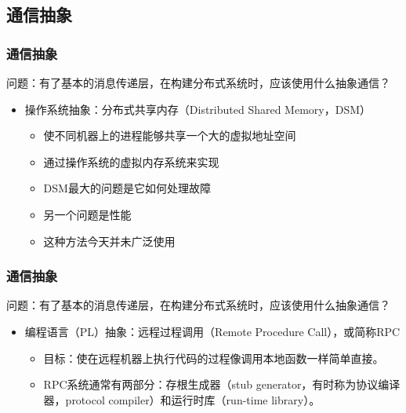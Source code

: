 \subsection{通信抽象} %
\begin{frame}[fragile]
    \frametitle{通信抽象}
    问题：有了基本的消息传递层，在构建分布式系统时，应该使用什么抽象通信？
    \begin{itemize}
        \item 操作系统抽象：分布式共享内存（Distributed Shared Memory，DSM）\pause
                    \begin{itemize}
            \item 使不同机器上的进程能够共享一个大的虚拟地址空间
            \item 通过操作系统的虚拟内存系统来实现
            \item DSM最大的问题是它如何处理故障
            \item 另一个问题是性能
            \item 这种方法今天并未广泛使用
        \end{itemize}
    \end{itemize}
    
\end{frame}

\begin{frame}[fragile]
    \frametitle{通信抽象}
    问题：有了基本的消息传递层，在构建分布式系统时，应该使用什么抽象通信？
    \begin{itemize}
        \item 编程语言（PL）抽象：远程过程调用（Remote Procedure Call），或简称RPC \pause
        \begin{itemize}
            \item 目标：使在远程机器上执行代码的过程像调用本地函数一样简单直接。
            \item RPC系统通常有两部分：存根生成器（stub generator，有时称为协议编译器，protocol compiler）和运行时库（run-time library）。
        \end{itemize}
    \end{itemize}
    
\end{frame}

